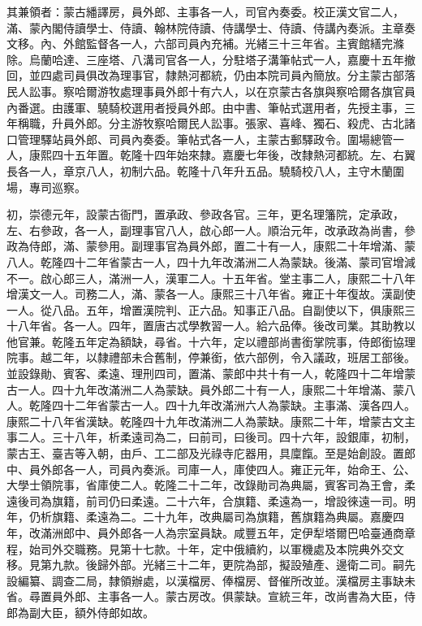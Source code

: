 \begin{pinyinscope}
其兼領者：蒙古繙譯房，員外郎、主事各一人，司官內奏委。校正漢文官二人，滿、蒙內閣侍讀學士、侍讀、翰林院侍讀、侍講學士、侍讀、侍講內奏派。主章奏文移。內、外館監督各一人，六部司員內充補。光緒三十三年省。主賓館繕完滌除。烏蘭哈達、三座塔、八溝司官各一人，分駐塔子溝筆帖式一人，嘉慶十五年撤回，並四處司員俱改為理事官，隸熱河都統，仍由本院司員內簡放。分主蒙古部落民人訟事。察哈爾游牧處理事員外郎十有六人，以在京蒙古各旗與察哈爾各旗官員內番選。由護軍、驍騎校選用者授員外郎。由中書、筆帖式選用者，先授主事，三年稱職，升員外郎。分主游牧察哈爾民人訟事。張家、喜峰、獨石、殺虎、古北諸口管理驛站員外郎、司員內奏委。筆帖式各一人，主蒙古郵驛政令。圍場總管一人，康熙四十五年置。乾隆十四年始來隸。嘉慶七年後，改隸熱河都統。左、右翼長各一人，章京八人，初制六品。乾隆十八年升五品。驍騎校八人，主守木蘭圍場，專司巡察。

初，崇德元年，設蒙古衙門，置承政、參政各官。三年，更名理籓院，定承政，左、右參政，各一人，副理事官八人，啟心郎一人。順治元年，改承政為尚書，參政為侍郎，滿、蒙參用。副理事官為員外郎，置二十有一人，康熙二十年增滿、蒙八人。乾隆四十二年省蒙古一人，四十九年改滿洲二人為蒙缺。後滿、蒙司官增減不一。啟心郎三人，滿洲一人，漢軍二人。十五年省。堂主事二人，康熙二十八年增漢文一人。司務二人，滿、蒙各一人。康熙三十八年省。雍正十年復故。漢副使一人。從八品。五年，增置漢院判、正六品。知事正八品。自副使以下，俱康熙三十八年省。各一人。四年，置唐古忒學教習一人。給六品俸。後改司業。其助教以他官兼。乾隆五年定為額缺，尋省。十六年，定以禮部尚書銜掌院事，侍郎銜協理院事。越二年，以隸禮部未合舊制，停兼銜，依六部例，令入議政，班居工部後。並設錄勛、賓客、柔遠、理刑四司，置滿、蒙郎中共十有一人，乾隆四十二年增蒙古一人。四十九年改滿洲二人為蒙缺。員外郎二十有一人，康熙二十年增滿、蒙八人。乾隆四十二年省蒙古一人。四十九年改滿洲六人為蒙缺。主事滿、漢各四人。康熙二十八年省漢缺。乾隆四十九年改滿洲二人為蒙缺。康熙二十年，增蒙古文主事二人。三十八年，析柔遠司為二，曰前司，曰後司。四十六年，設銀庫，初制，蒙古王、臺吉等入朝，由戶、工二部及光祿寺庀器用，具廩餼。至是始創設。置郎中、員外郎各一人，司員內奏派。司庫一人，庫使四人。雍正元年，始命王、公、大學士領院事，省庫使二人。乾隆二十二年，改錄勛司為典屬，賓客司為王會，柔遠後司為旗籍，前司仍曰柔遠。二十六年，合旗籍、柔遠為一，增設徠遠一司。明年，仍析旗籍、柔遠為二。二十九年，改典屬司為旗籍，舊旗籍為典屬。嘉慶四年，改滿洲郎中、員外郎各一人為宗室員缺。咸豐五年，定伊犁塔爾巴哈臺通商章程，始司外交職務。見第十七款。十年，定中俄續約，以軍機處及本院典外交文移。見第九款。後歸外部。光緒三十二年，更院為部，擬設殖產、邊衛二司。嗣先設編纂、調查二局，隸領辦處，以漢檔房、俸檔房、督催所改並。漢檔房主事缺未省。尋置員外郎、主事各一人。蒙古房改。俱蒙缺。宣統三年，改尚書為大臣，侍郎為副大臣，額外侍郎如故。


\end{pinyinscope}
